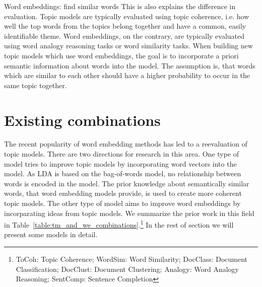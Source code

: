 \documentclass[
        a4paper,
        titlepage,
        twoside,
        parskip
        ]{scrbook}
\theoremstyle{break}
\begin{document}
Word embeddings: find similar words
This is also explains the difference in evaluation.
Topic models are typically evaluated using topic coherence, i.e. how well the top words from the topics belong together and have a common, easily identifiable theme.
Word embeddings, on the contrary, are typically evaluated using word analogy reasoning tasks or word similarity tasks.
When building new topic models which use word embeddings, the goal is to incorporate a priori semantic information about words into the model.
The assumption is, that words which are similar to each other should have a higher probability to occur in the same topic together.


\section{Existing combinations}
The recent popularity of word embedding methods has led to a reevaluation of topic models.
There are two directions for research in this area.
One type of model tries to improve topic models by incorporating word vectors into the model.
As LDA is based on the bag-of-words model, no relationship between words is encoded in the model.
The prior knowledge about semantically similar words, that word embedding models provide, is used to create more coherent topic models.
The other type of model aims to improve word embeddings by incorparating ideas from topic models.
We summarize the prior work in this field in Table~\ref{table:tm_and_we_combinations}.\footnote{ToCoh: Topic Coherence; WordSim: Word Similarity; DocClass: Document Classification; DocClust: Document Clustering; Analogy: Word Analogy Reasoning; SentComp: Sentence Completion}
In the rest of section we will present some models in detail.
\end{document}

